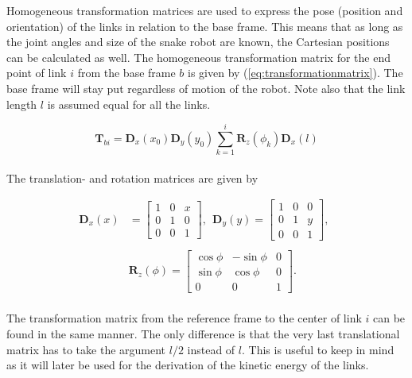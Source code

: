 Homogeneous transformation matrices are used to express the pose (position and orientation) of the links in relation to the base frame. This means that as long as the joint angles and size of the snake robot are known, the Cartesian positions can be calculated as well.
The homogeneous transformation matrix for the end point of link $i$ from the base frame $b$ is given by (\ref{eq:transformationmatrix}). The base frame will stay put regardless of motion of the robot. Note also that the link length $l$ is assumed equal for all the links.

\begin{equation} \label{eq:transformationmatrix}
    \textbf{T}_{b i} = \textbf{D}_x(x_0) \textbf{D}_y(y_0) \sum_{k=1}^{i} \textbf{R}_z(\phi_k) \textbf{D}_x(l)
\end{equation}
\\
The translation- and rotation matrices are given by

\begin{equation}\label{eq:trans_rot}
    \begin{split}
        \textbf{D}_x(x)& = 
        \begin{bmatrix}
            1 & 0 & x \\
            0 & 1 & 0 \\
            0 & 0 & 1
        \end{bmatrix}, \ \
        \textbf{D}_y(y) =
        \begin{bmatrix}
            1 & 0 & 0 \\
            0 & 1 & y \\
            0 & 0 & 1
        \end{bmatrix}, \ \
        \\&
        \\&\textbf{R}_z(\phi) =
        \begin{bmatrix}
            \cos{\phi} & -\sin{\phi} & 0 \\
            \sin{\phi} &  \cos{\phi} & 0 \\
            0          &  0          & 1
        \end{bmatrix}.
    \end{split}
\end{equation}
\\
The transformation matrix from the reference frame to the center of link $i$ can be found in the same manner. The only difference is that the very last translational matrix has to take the argument $l/2$ instead of $l$. This is useful to keep in mind as it will later be used for the derivation of the kinetic energy of the links.

